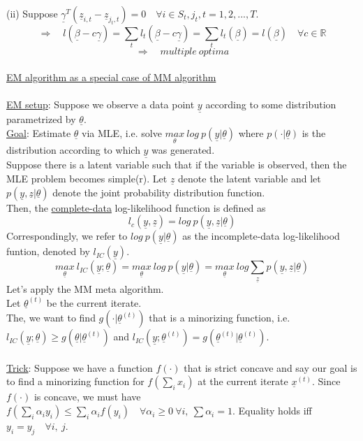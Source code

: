 \documentclass[11pt]{article}
\begin{document}
(ii) Suppose $\underline{\gamma}^T(\underline{z}_{i,t}-\underline{z}_{j_t,t})=0 \quad \forall i\in S_t, j_t, t=1,2,...,T$.\\
$$\Longrightarrow \quad l(\underline{\beta}-c\underline{\gamma})=\sum_{t}l_t(\underline{\beta}-c\underline{\gamma})=\sum_{t}l_t(\underline{\beta})=l(\underline{\beta})\quad \forall c\in\mathbb{R}$$
$$\Longrightarrow \quad multiple\ optima$$\\
{\LARGE \underline{EM algorithm as a special case of MM algorithm}}\\~\\
\underline{EM setup}: Suppose we observe a data point $\underline{y}$ according to some distribution parametrized by $\underline{\theta}$.\\
\underline{Goal}: Estimate $\underline{\theta}$ via MLE, i.e. solve $\underset{\theta}{max}\ log\ p(\underline{y}|\underline{\theta})$ where $p(\cdot|\underline{\theta})$ is the distribution according to which $\underline{y}$ was generated.\\
Suppose there is a latent variable such that if the variable is observed, then the MLE problem becomes simple(r). Let $\underline{z}$ denote the latent variable and let $p(\underline{y},\underline{z}|\underline{\theta})$ denote the joint probability distribution function.\\
Then, the \underline{complete-data} log-likelihood function is defined as
$$l_c(\underline{y},\underline{z})=log\ p(\underline{y},\underline{z}|\underline{\theta})$$
Correspondingly, we refer to $log\ p(\underline{y}|\underline{\theta})$ as the incomplete-data log-likelihood funtion, denoted by $l_{IC}(\underline{y})$.
$$\underset{\underline{\theta}}{max}\ l_{IC}(\underline{y};\underline{\theta})=\underset{\underline{\theta}}{max}\ log\ p(\underline{y}|\underline{\theta})= \underset{\underline{\theta}}{max}\ log \sum_{\underline{z}} p(\underline{y},\underline{z}|\underline{\theta})$$
Let's apply the MM meta algorithm.\\
Let $\underline{\theta}^{(t)}$ be the current iterate.\\
The, we want to find $g(\cdot|\underline{\theta}^{(t)})$ that is a minorizing function, i.e. $l_{IC}(\underline{y};\underline{\theta})\geq g(\underline{\theta}|\underline{\theta}^{(t)})$ and $l_{IC}(\underline{y};\underline{\theta}^{(t)})=g(\underline{\theta}^{(t)}|\underline{\theta}^{(t)})$.\\~\\
\underline{Trick}: Suppose we have a function $f(\cdot)$ that is strict concave and say our goal is to find a minorizing function for $f(\sum_{i}x_i)$ at the current iterate $\underline{x}^{(t)}$. Since $f(\cdot)$ is concave, we must have $f(\sum_{i}\alpha_iy_i)\leq\sum_{i}\alpha_i f(y_i)\quad \forall \alpha_i\geq 0\ \forall i,\ \sum\alpha_i=1$. Equality holds iff $y_i=y_j\quad \forall i,\ j$.\\
\end{document}
